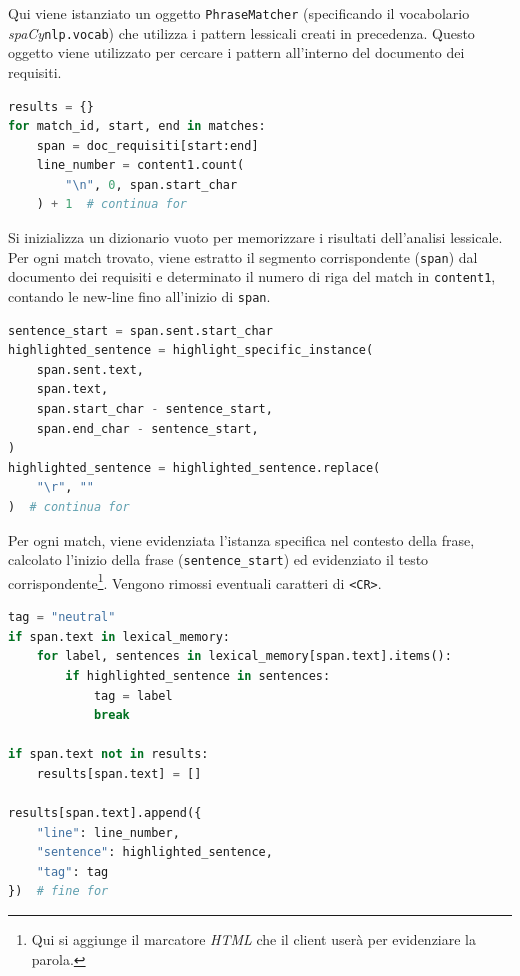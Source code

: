 \documentclass[12pt]{report}
\newcommand{\spacy}{\textsl{spaCy}\xspace}
\newcommand{\html}{\textsl{HTML}\xspace}
\begin{document}
\noindent Qui viene istanziato un oggetto \texttt{PhraseMatcher} (specificando il vocabolario \spacy \texttt{nlp.vocab}) che utilizza i pattern lessicali creati in precedenza. Questo oggetto viene utilizzato per cercare i pattern all'interno del documento dei requisiti.


\begin{mdframed}
\small
\begin{lstlisting}[language=Python]
results = {}
for match_id, start, end in matches:
    span = doc_requisiti[start:end]
    line_number = content1.count(
        "\n", 0, span.start_char
    ) + 1  # continua for
\end{lstlisting}
\end{mdframed}

\noindent Si inizializza un dizionario vuoto per memorizzare i risultati dell'analisi lessicale. Per ogni match trovato, viene estratto il segmento corrispondente (\texttt{span}) dal documento dei requisiti e determinato il numero di riga del match in \texttt{content1}, contando le new-line fino all'inizio di \texttt{span}.


\begin{mdframed}
\small
\begin{lstlisting}[language=Python]
sentence_start = span.sent.start_char
highlighted_sentence = highlight_specific_instance(
    span.sent.text,
    span.text,
    span.start_char - sentence_start,
    span.end_char - sentence_start,
)
highlighted_sentence = highlighted_sentence.replace(
    "\r", ""
)  # continua for
\end{lstlisting}
\end{mdframed}

\noindent Per ogni match, viene evidenziata l'istanza specifica nel contesto della frase, calcolato l'inizio della frase (\texttt{sentence\_start}) ed evidenziato il testo corrispondente\footnote{Qui si aggiunge il marcatore \html che il client userà per evidenziare la parola.}. Vengono rimossi eventuali caratteri di \texttt{<CR>}.


\begin{mdframed}
\small
\begin{lstlisting}[language=Python]
tag = "neutral"
if span.text in lexical_memory:
    for label, sentences in lexical_memory[span.text].items():
        if highlighted_sentence in sentences:
            tag = label
            break

if span.text not in results:
    results[span.text] = []

results[span.text].append({
    "line": line_number,
    "sentence": highlighted_sentence,
    "tag": tag
})  # fine for
\end{lstlisting}
\end{mdframed}
\end{document}
